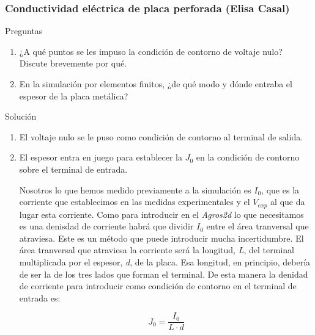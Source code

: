 \vspace*{2em}
\begin{Enunciado}
    \subsubsection{Conductividad eléctrica de placa perforada (Elisa Casal)}
    Preguntas
    \begin{enumerate}[label=\alph*)]
    \item ¿A qué puntos se les impuso la condición de contorno de voltaje nulo? Discute brevemente por qué.
    \item En la simulación por elementos finitos, ¿de qué modo y dónde entraba el espesor de la placa metálica?
    \end{enumerate}
    \end{Enunciado}
    
Solución
\begin{enumerate}[label=\alph*)]
	\item El voltaje nulo se le puso como condición de contorno al terminal de salida.

	\item El espesor entra en juego para establecer la $J_0$ en la condición de contorno sobre el terminal de entrada.

	      Nosotros lo que hemos medido previamente a la simulación es $I_0$, que es la corriente que establecimos en las medidas experimentales y el $V_{exp}$ al que da lugar esta corriente. Como para introducir en el \textit{Agros2d} lo que necesitamos es una denisdad de corriente habrá que dividir $I_0$ entre el área tranversal que atraviesa. Este es un método que puede introducir mucha incertidumbre. El área tranversal que atraviesa la corriente será la longitud, \textit{L}, del terminal multiplicada por el espesor, \textit{d}, de la placa. Esa longitud, en principio, debería de ser la de los tres lados que forman el terminal. De esta manera la denidad de corriente para introducir como condición de contorno en el terminal de entrada es:

	      \begin{equation}
		      J_0=\frac{I_0}{L \cdot d}
	      \end{equation}
\end{enumerate}

\vspace*{2em}

